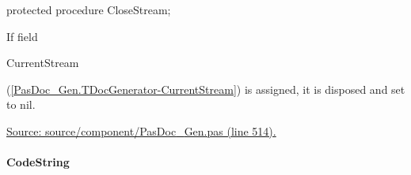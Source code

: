 \documentclass{report}
\newif\ifpdf
\begin{document}
\label{PasDoc_Gen.TDocGenerator-CloseStream}
\begin{list}{}{
\setlength{\itemindent}{0cm}
\setlength{\listparindent}{0cm}
\setlength{\leftmargin}{\evensidemargin}
\addtolength{\leftmargin}{\tmplength}
\settowidth{\labelsep}{X}
\addtolength{\leftmargin}{\labelsep}
\setlength{\labelwidth}{\tmplength}
}
\item[\textbf{Declaration}\hfill]
\ifpdf
\begin{flushleft}
\fi
\begin{ttfamily}
protected procedure CloseStream;\end{ttfamily}

\ifpdf
\end{flushleft}
\fi

\par
\item[\textbf{Description}]
If field \begin{ttfamily}CurrentStream\end{ttfamily}(\ref{PasDoc_Gen.TDocGenerator-CurrentStream}) is assigned, it is disposed and set to nil.\par
\href{https://github.com/pasdoc/pasdoc/blob/master/source/component/PasDoc_Gen.pas#L514}{Source: source/component/PasDoc{\_}Gen.pas (line 514).}

\end{list}
\paragraph*{CodeString}\hspace*{\fill}
\end{document}
